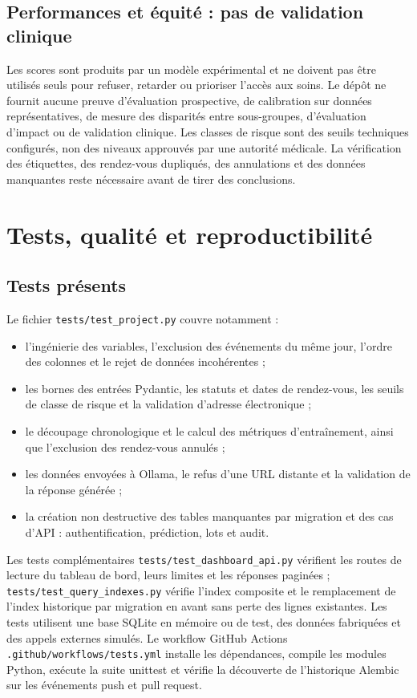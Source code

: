 \documentclass[11pt,a4paper]{report}
\newcommand{\code}[1]{\texttt{#1}}
\begin{document}
\section{Performances et équité : pas de validation clinique}
Les scores sont produits par un modèle expérimental et ne doivent pas être
utilisés seuls pour refuser, retarder ou prioriser l'accès aux soins. Le dépôt
ne fournit aucune preuve d'évaluation prospective, de calibration sur données
représentatives, de mesure des disparités entre sous-groupes, d'évaluation
d'impact ou de validation clinique. Les classes de risque sont des seuils
techniques configurés, non des niveaux approuvés par une autorité médicale.
La vérification des étiquettes, des rendez-vous dupliqués, des annulations et
des données manquantes reste nécessaire avant de tirer des conclusions.

\chapter{Tests, qualité et reproductibilité}
\section{Tests présents}
Le fichier \code{tests/test\_project.py} couvre notamment :
\begin{itemize}
  \item l'ingénierie des variables, l'exclusion des événements du même jour,
        l'ordre des colonnes et le rejet de données incohérentes ;
  \item les bornes des entrées Pydantic, les statuts et dates de rendez-vous,
        les seuils de classe de risque et la validation d'adresse électronique ;
  \item le découpage chronologique et le calcul des métriques d'entraînement,
        ainsi que l'exclusion des rendez-vous annulés ;
  \item les données envoyées à Ollama, le refus d'une URL distante et la
        validation de la réponse générée ;
  \item la création non destructive des tables manquantes par migration et
        des cas d'API : authentification, prédiction, lots et audit.
\end{itemize}
Les tests complémentaires \code{tests/test\_dashboard\_api.py} vérifient les
routes de lecture du tableau de bord, leurs limites et les réponses
paginées ; \code{tests/test\_query\_indexes.py} vérifie l'index composite et
le remplacement de l'index historique par migration en avant sans perte des
lignes existantes.
Les tests utilisent une base SQLite en mémoire ou de test, des données
fabriquées et des appels externes simulés. Le workflow GitHub Actions
\code{.github/workflows/tests.yml} installe les dépendances, compile les
modules Python, exécute la suite unittest et vérifie la découverte de
l'historique Alembic sur les événements push et pull request.
\end{document}
